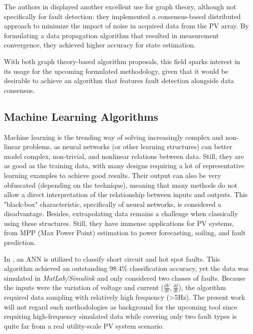 The authors in \cite{Katoch2018} displayed another excellent use for graph theory, although not specifically for fault detection: they implemented a consensus-based distributed approach to minimize the impact of noise in acquired data from the PV array. By formulating a data propagation algorithm that resulted in measurement convergence, they achieved higher accuracy for state estimation.

With both graph theory-based algorithm proposals, this field sparks interest in its usage for the upcoming formulated methodology, given that it would be desirable to achieve an algorithm that features fault detection alongside data consensus.


\subsection{Machine Learning Algorithms} \label{subsec:machinelearning}

Machine learning is the trending way of solving increasingly complex and non-linear problems, as neural networks (or other learning structures) can better model complex, non-trivial, and nonlinear relations between data. Still, they are as good as the training data, with many designs requiring a lot of representative learning examples to achieve good results. Their output can also be very obfuscated (depending on the technique), meaning that many methods do not allow a direct interpretation of the relationship between inputs and outputs. This "black-box" characteristic, specifically of neural networks, is considered a disadvantage. Besides, extrapolating data remains a challenge when classically using these structures. Still, they have immense applications for PV systems, from MPP (Max Power Point) estimation to power forecasting, soiling, and fault prediction.

In \cite{Kumari2022}, an ANN is utilized to classify short circuit and hot spot faults. This algorithm achieved an outstanding 98.4\% classification accuracy, yet the data was simulated in \textit{MatLab/Simulink} and only considered two classes of faults. Because the inputs were the variation of voltage and current ($\frac{dV}{dt},\frac{dI}{dt}$), the algorithm required data sampling with relatively high frequency (>5Hz). The present work will not regard such methodologies as background for the upcoming tool since requiring high-frequency simulated data while covering only two fault types is quite far from a real utility-scale PV system scenario.


